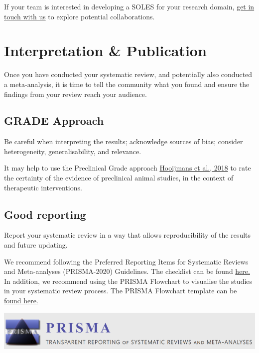 \documentclass[
]{book}
\begin{document}
If your team is interested in developing a SOLES for your research domain, \href{mailto:camarades.berlin@charite.de}{get in touch with us} to explore potential collaborations.

\chapter{Interpretation \& Publication}\label{interpretation-publication}

Once you have conducted your systematic review, and potentially also conducted a meta-analysis, it is time to tell the community what you found and ensure the findings from your review reach your audience.

\section{GRADE Approach}\label{grade-approach}

Be careful when interpreting the results; acknowledge sources of bias; consider heterogeneity, generalisability, and relevance.

It may help to use the Preclinical Grade approach \href{https://journals.plos.org/plosone/article?id=10.1371/journal.pone.0187271}{Hooijmans et al., 2018} to rate the certainty of the evidence of preclinical animal studies, in the context of therapeutic interventions.

\section{Good reporting}\label{good-reporting}

Report your systematic review in a way that allows reproducibility of the results and future updating.

We recommend following the Preferred Reporting Items for Systematic Reviews and Meta-analyses (PRISMA-2020) Guidelines. The checklist can be found \href{https://www.prisma-statement.org/prisma-2020-checklist}{here.} In addition, we recommend using the PRISMA Flowchart to visualise the studies in your systematic review process. The PRISMA Flowchart template can be \href{https://www.prisma-statement.org/prisma-2020-flow-diagram}{found here.}

\includegraphics{figs/PRISMA.png}
\end{document}
